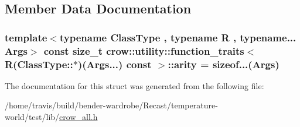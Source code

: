 \subsection{Member Data Documentation}
\hypertarget{structcrow_1_1utility_1_1function__traits_3_01_r_07_class_type_1_1_5_08_07_args_8_8_8_08_01const_01_01_4_aa415070be54c75d9ffc02d3a2c82c8df}{
\subsubsection[{arity}]{\setlength{\rightskip}{0pt plus 5cm}template$<$typename Class\-Type , typename R , typename... Args$>$ const size\-\_\-t {\bf crow\-::utility\-::function\-\_\-traits}$<$ R(Class\-Type\-::$\ast$)(Args...) const  $>$\-::arity = sizeof...(Args)\hspace{0.3cm}{\ttfamily [static]}}}\label{structcrow_1_1utility_1_1function__traits_3_01_r_07_class_type_1_1_5_08_07_args_8_8_8_08_01const_01_01_4_aa415070be54c75d9ffc02d3a2c82c8df}


The documentation for this struct was generated from the following file\-:\begin{DoxyCompactItemize}
\item 
/home/travis/build/bender-\/wardrobe/\-Recast/temperature-\/world/test/lib/\hyperlink{crow__all_8h}{crow\-\_\-all.\-h}\end{DoxyCompactItemize}
